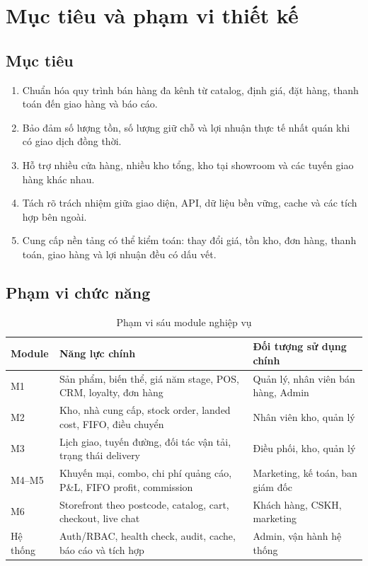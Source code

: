 \documentclass[12pt,a4paper]{report}
\begin{document}
\chapter{Mục tiêu và phạm vi thiết kế}
\section{Mục tiêu}
\begin{enumerate}
  \item Chuẩn hóa quy trình bán hàng đa kênh từ catalog, định giá, đặt hàng, thanh toán đến giao hàng và báo cáo.
  \item Bảo đảm số lượng tồn, số lượng giữ chỗ và lợi nhuận thực tế nhất quán khi có giao dịch đồng thời.
  \item Hỗ trợ nhiều cửa hàng, nhiều kho tổng, kho tại showroom và các tuyến giao hàng khác nhau.
  \item Tách rõ trách nhiệm giữa giao diện, API, dữ liệu bền vững, cache và các tích hợp bên ngoài.
  \item Cung cấp nền tảng có thể kiểm toán: thay đổi giá, tồn kho, đơn hàng, thanh toán, giao hàng và lợi nhuận đều có dấu vết.
\end{enumerate}

\section{Phạm vi chức năng}
\begin{table}[H]
\centering
\begin{tabularx}{\textwidth}{P{2.8cm}Y Y}
\toprule
Module & Năng lực chính & Đối tượng sử dụng chính\\
\midrule
M1 & Sản phẩm, biến thể, giá năm stage, POS, CRM, loyalty, đơn hàng & Quản lý, nhân viên bán hàng, Admin\\
M2 & Kho, nhà cung cấp, stock order, landed cost, FIFO, điều chuyển & Nhân viên kho, quản lý\\
M3 & Lịch giao, tuyến đường, đối tác vận tải, trạng thái delivery & Điều phối, kho, quản lý\\
M4--M5 & Khuyến mại, combo, chi phí quảng cáo, P\&L, FIFO profit, commission & Marketing, kế toán, ban giám đốc\\
M6 & Storefront theo postcode, catalog, cart, checkout, live chat & Khách hàng, CSKH, marketing\\
Hệ thống & Auth/RBAC, health check, audit, cache, báo cáo và tích hợp & Admin, vận hành hệ thống\\
\bottomrule
\end{tabularx}
\caption{Phạm vi sáu module nghiệp vụ}
\end{table}
\end{document}
